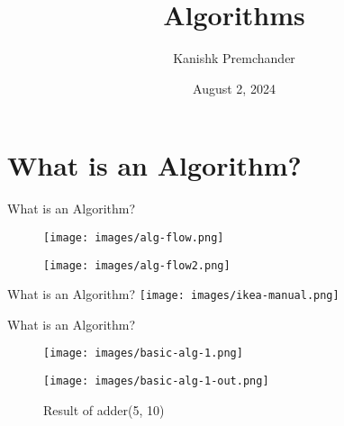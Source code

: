 \documentclass[aspectratio=169]{beamer}
\begin{document}
\title{Algorithms}
\author[Premchander]{Kanishk Premchander}
\date[08/02/2024]{August 2, 2024}

\frame{\titlepage}

\section{What is an Algorithm?}

\begin{frame}{What is an Algorithm?} \pause
    \begin{figure}
        \begin{minipage}{0.5\textwidth}
            \centering
            \texttt{[image: images/alg-flow.png]}
        \end{minipage}
        \begin{minipage}{0.5\textwidth}
            \centering
            \texttt{[image: images/alg-flow2.png]}
        \end{minipage}
    \end{figure}
\end{frame}

\begin{frame}{What is an Algorithm?}
    \centering
    \texttt{[image: images/ikea-manual.png]}
\end{frame}

\begin{frame}{What is an Algorithm?} \pause
    \begin{figure}
        \begin{minipage}{0.5\textwidth}
            \centering
            \texttt{[image: images/basic-alg-1.png]}
            \caption{Simple Addition Algorithm} \pause
        \end{minipage}
        \begin{minipage}{0.5\textwidth}
            \centering
            \texttt{[image: images/basic-alg-1-out.png]}
            \caption{Result of adder(5, 10)}
        \end{minipage}
    \end{figure}
\end{frame}
\end{document}
